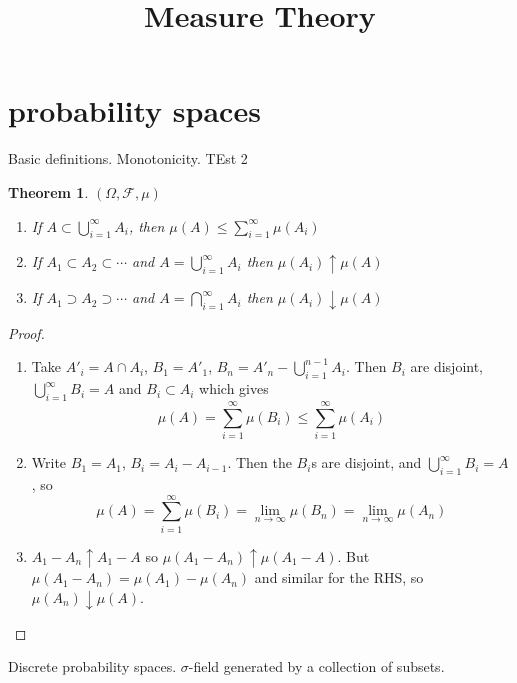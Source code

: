 \documentclass{article}
\title{Measure Theory}
\date{}
\newtheorem{theorem}{Theorem}
\theoremstyle{definition}
\newcommand{\Filt}{\mathcal F}
\begin{document}
\maketitle

\section{probability spaces}

Basic definitions. Monotonicity. TEst 2

\begin{theorem}
    \((\Omega, \Filt, \mu) \)
    \begin{enumerate}
        \item If \( A \subset \bigcup_{i = 1}^\infty A_i \), then \(\mu(A) \leq \sum_{i =1}^\infty \mu(A_i) \)
        \item If \( A_1 \subset A_2 \subset \cdots \) and \( A = \bigcup_{i = 1}^\infty A_i\) then \(\mu(A_i) \uparrow \mu(A) \)
        \item If \( A_1 \supset A_2 \supset \cdots \) and \( A = \bigcap_{i = 1}^\infty A_i \) then \(\mu(A_i) \downarrow \mu(A) \)
    \end{enumerate}
\end{theorem}

\begin{proof}

    \begin{enumerate}
        \item Take \(A'_i = A \cap A_i\), \(B_1 = A'_1\), \(B_n = A'_n - \bigcup_{i =1}^{n-1} A_i\).
              Then \(B_i\) are disjoint, \(\bigcup_{i =1}^\infty B_i = A\) and \(B_i \subset A_i\) which gives
              \[\mu(A)=\sum_{i =1}^\infty\mu(B_i) \leq \sum_{i = 1}^\infty \mu(A_i)\]
        \item Write \(B_1 = A_1\), \(B_i = A_i - A_{i-1}\). Then the \(B_i\)s are disjoint, and \(\bigcup_{i = 1}^\infty B_i = A\), so
              \[\mu(A) = \sum_{i =1}^\infty \mu(B_i) = \lim_{n \rightarrow \infty} \mu(B_n) = \lim_{n \rightarrow \infty} \mu(A_n)\]
        \item \(A_1 - A_n \uparrow A_1 - A\) so \(\mu(A_1 - A_n) \uparrow \mu(A_1 - A)\). But \(\mu(A_1 - A_n) = \mu(A_1) - \mu(A_n)\) and similar for the RHS, so \(\mu(A_n) \downarrow \mu(A)\).
    \end{enumerate}
\end{proof}

Discrete probability spaces. \(\sigma\)-field generated by a collection of subsets.
\end{document}
